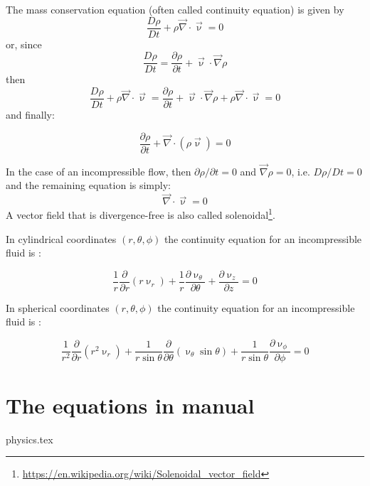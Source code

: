 The mass conservation equation (often called continuity equation) is given by
\[
\frac{D\rho}{Dt} + \rho {\vec \nabla}\cdot{\vec \upnu} = 0
\]
or, since 
\[
\frac{D\rho}{Dt} = \frac{\partial \rho}{\partial t} + {\vec \upnu}\cdot {\vec \nabla}\rho
\]
then 
\[
\frac{D\rho}{Dt} + \rho {\vec \nabla}\cdot{\vec \upnu} = 
\frac{\partial \rho}{\partial t} + {\vec \upnu}\cdot {\vec \nabla}\rho
 + \rho {\vec \nabla}\cdot{\vec \upnu} = 0 
\]
and finally:
\begin{mdframed}[backgroundcolor=blue!5]
\begin{equation}
\frac{\partial \rho}{\partial t} + {\vec \nabla}\cdot(\rho {\vec \upnu}) = 0
\label{eq:massconvgen}
\end{equation}
\end{mdframed}
In the case of an incompressible flow, then $\partial \rho/\partial t=0$ and 
${\vec \nabla}\rho=0$, i.e. $D\rho/Dt=0$ and the remaining equation is simply:
\[
{\vec \nabla}\cdot{\vec \upnu} = 0
\]
A vector field that is divergence-free is also called 
solenoidal\footnote{\url{https://en.wikipedia.org/wiki/Solenoidal_vector_field}}.


In cylindrical coordinates $(r,\theta,\phi)$ 
the continuity equation for an incompressible fluid is :

\begin{mdframed}[backgroundcolor=blue!5]
\[
\frac{1}{r} \frac{\partial}{\partial r} (r \upnu_r) 
+
\frac{1}{r} \frac{\partial \upnu_\theta}{\partial \theta}
+
\frac{\partial \upnu_z}{\partial z}=0
\]
\end{mdframed}


In spherical coordinates $(r,\theta,\phi)$ 
the continuity equation for an incompressible fluid is :

\begin{mdframed}[backgroundcolor=blue!5]
\begin{equation}
\frac{1}{r^2} \frac{\partial}{\partial r} (r^2 \upnu_r) 
+
\frac{1}{r \sin\theta} \frac{\partial}{\partial \theta} (\upnu_\theta \sin\theta)
+
\frac{1}{r \sin\theta} \frac{\partial \upnu_\phi}{\partial \phi}=0
\label{eq:divscc}
\end{equation}
\end{mdframed}



\section{The equations in \aspect manual}
\begin{flushright} {\tiny {\color{gray} physics.tex}} \end{flushright}

